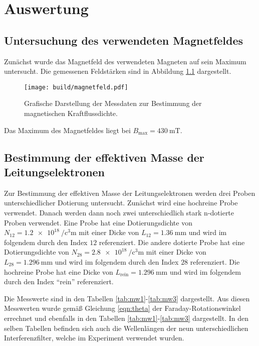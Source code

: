 \chapter{Auswertung}
\label{cha:Auswertung}
\section{Untersuchung des verwendeten Magnetfeldes}
\label{sec:magn}

Zunächst wurde das Magnetfeld des verwendeten Magneten auf sein Maximum untersucht. Die gemessenen Feldstärken sind in Abbildung \ref{fig:magnetfeld} dargestellt. 

\begin{figure}
              \centering
              \texttt{[image: build/magnetfeld.pdf]}
              \caption{Grafische Darstellung der Messdaten zur Bestimmung der magnetischen Kraftflussdichte.}
              \label{fig:magnetfeld}
\end{figure}
Das Maximum des Magnetfeldes liegt bei $B_\mathrm{max} = \qty{430}{\milli\tesla}$.

\section{Bestimmung der effektiven Masse der Leitungselektronen}
\label{sec:effektive_masse}
Zur Bestimmung der effektiven Masse der Leitungselektronen werden drei  Proben unterschiedlicher Dotierung untersucht. Zunächst wird eine hochreine 
Probe verwendet. Danach werden dann noch zwei unterschiedlich stark n-dotierte Proben verwendet. Eine Probe hat eine Dotierungsdichte von $N_{12} = \qty{1.2e18}{\per\cubic\centi\metre}$
mit einer Dicke von $L_{12} = \qty{1.36}{\milli\metre}$ und wird im folgendem durch den Index $12$ referenziert. Die andere dotierte Probe hat eine 
Dotierungsdichte von $N_{28} = \qty{2.8e18}{\per\cubic\centi\metre}$ mit einer Dicke von $L_{28} = \qty{1.296}{\milli\metre}$ und wird im folgendem durch den Index 
$28$ referenziert. Die hochreine  Probe hat eine Dicke von $L_\mathrm{rein} = \qty{1.296}{\milli\metre}$ und wird im folgendem durch den Index \enquote{rein} referenziert.

Die Messwerte sind in den Tabellen \ref{tab:mw1}-\ref{tab:mw3} dargestellt. Aus diesen Messwerten wurde gemäß Gleichung \eqref{eqn:theta} der Faraday-Rotationswinkel errechnet und ebenfalls 
in den Tabellen \ref{tab:mw1}-\ref{tab:mw3} dargestellt. In den selben Tabellen befinden sich auch die Wellenlängen der neun unterschiedlichen Interferenzfilter, 
welche im Experiment verwendet wurden. 


